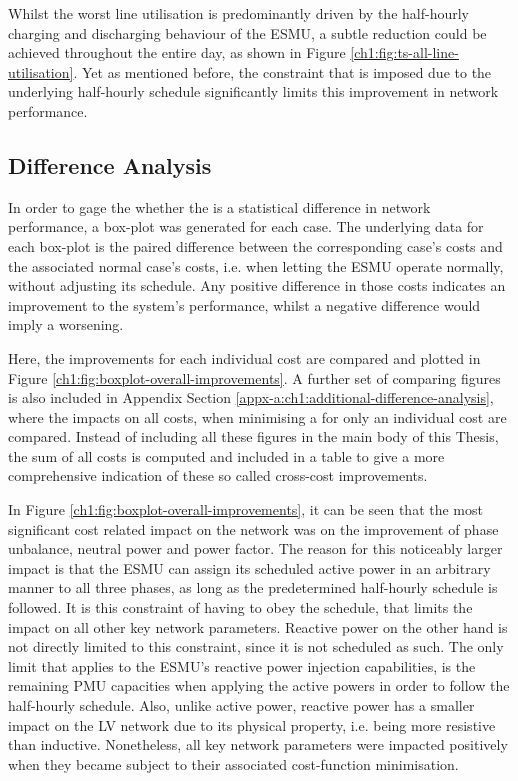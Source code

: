 

Whilst the worst line utilisation is predominantly driven by the half-hourly charging and discharging behaviour of the ESMU, a subtle reduction could be achieved throughout the entire day, as shown in Figure \ref{ch1:fig:ts-all-line-utilisation}.
Yet as mentioned before, the constraint that is imposed due to the underlying half-hourly schedule significantly limits this improvement in network performance.

\subsection{Difference Analysis}
\label{ch1:subsec:difference-analysis}

In order to gage the whether the is a statistical difference in network performance, a box-plot was generated for each case.
The underlying data for each box-plot is the paired difference between the corresponding case's costs and the associated normal case's costs, i.e. when letting the ESMU operate normally, without adjusting its schedule.
Any positive difference in those costs indicates an improvement to the system's performance, whilst a negative difference would imply a worsening.

Here, the improvements for each individual cost are compared and plotted in Figure \ref{ch1:fig:boxplot-overall-improvements}.
A further set of comparing figures is also included in Appendix Section \ref{appx-a:ch1:additional-difference-analysis}, where the impacts on all costs, when minimising a for only an individual cost are compared.
Instead of including all these figures in the main body of this Thesis, the sum of all costs is computed and included in a table to give a more comprehensive indication of these so called cross-cost improvements.



In Figure \ref{ch1:fig:boxplot-overall-improvements}, it can be seen that the most significant cost related impact on the network was on the improvement of phase unbalance, neutral power and power factor.
The reason for this noticeably larger impact is that the ESMU can assign its scheduled active power in an arbitrary manner to all three phases, as long as the predetermined half-hourly schedule is followed.
It is this constraint of having to obey the schedule, that limits the impact on all other key network parameters.
Reactive power on the other hand is not directly limited to this constraint, since it is not scheduled as such.
The only limit that applies to the ESMU's reactive power injection capabilities, is the remaining PMU capacities when applying the active powers in order to follow the half-hourly schedule.
Also, unlike active power, reactive power has a smaller impact on the LV network due to its physical property, i.e. being more resistive than inductive.
Nonetheless, all key network parameters were impacted positively when they became subject to their associated cost-function minimisation.

